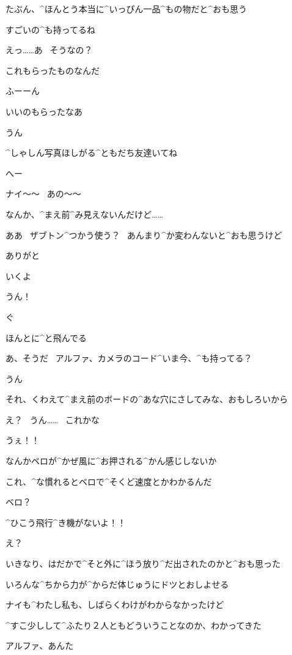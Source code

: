 \Nai たぶん、^{ほんとう}{本当}に^{いっぴん}{一品}^{もの}{物}だと^{おも}{思}う

\Nai すごいの^{も}{持}ってるね

\page
\Alpha えっ……あ
\ そうなの？

\Alpha これもらったものなんだ

\Nai ふーーん

\Nai いいのもらったなあ

\Alpha うん

\Nai ^{しゃしん}{写真}ほしがる^{ともだち}{友達}いてね

\Alpha へー

\page
\Alpha ナイ〜〜
\ あの〜〜

\Alpha なんか、^{まえ}{前}^{み}{見}えないんだけど……

\Nai ああ
\ ザブトン^{つかう}{使う}？
\ あんまり^{か}{変}わんないと^{おも}{思}うけど

\Alpha ありがと

\page
\Nai いくよ

\Alpha うん！

\page
\Alpha ぐ

\page[68]
\Alpha ほんとに^{と}{飛}んでる

\page
\Nai あ、そうだ
\ アルファ、カメラのコード^{いま}{今}、^{も}{持}ってる？

\Alpha うん

\Nai それ、くわえて^{まえ}{前}のボードの^{あな}{穴}にさしてみな、おもしろいから

\Alpha え？
\ うん……
\ これかな

\Alpha うぇ！！

\Nai なんかベロが^{かぜ}{風}に^{お}{押}される^{かん}{感}じしないか

\Nai これ、^{な}{慣}れるとベロで^{そくど}{速度}とかわかるんだ

\Alpha ベロ？

\page[71]
\Alpha ^{ひこう}{飛行}^{き}{機}がないよ！！

\Nai え？

\page
\Alpha いきなり、はだかで^{そと}{外}に^{ほう}{放}り^{だ}{出}されたのかと^{おも}{思}った

\Alpha いろんな^{ちから}{力}が^{からだ}{体}じゅうにドツとおしよせる

\Alpha ナイも^{わたし}{私}も、しばらくわけがわからなかったけど

\Alpha ^{すこ}{少}しして^{ふたり}{２人}ともどういうことなのか、わかってきた

\page
\Nai アルファ、あんた

